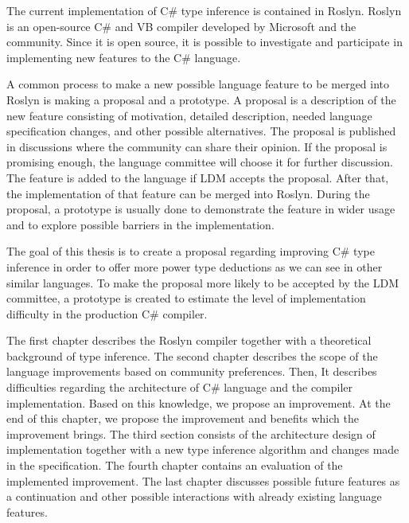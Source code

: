 The current implementation of C\# type inference is contained in Roslyn.
Roslyn is an open-source C\# and VB compiler developed by Microsoft and the community.
Since it is open source, it is possible to investigate and participate in implementing new features to the C\# language.

A common process to make a new possible language feature to be merged into Roslyn is making a proposal and a prototype.
A proposal is a description of the new feature consisting of motivation, detailed description, needed language specification changes, and other possible alternatives.
The proposal is published in discussions where the community can share their opinion.
If the proposal is promising enough, the language committee will choose it for further discussion.
The feature is added to the language if LDM accepts the proposal.
After that, the implementation of that feature can be merged into Roslyn.
During the proposal, a prototype is usually done to demonstrate the feature in wider usage and to explore possible barriers in the implementation.

The goal of this thesis is to create a proposal regarding improving C\# type inference in order to offer more power type deductions as we can see in other similar languages.
To make the proposal more likely to be accepted by the LDM committee, a prototype is created to estimate the level of implementation difficulty in the production C\# compiler.

The first chapter describes the Roslyn compiler together with a theoretical background of type inference.
The second chapter describes the scope of the language improvements based on community preferences.
Then, It describes difficulties regarding the architecture of C\# language and the compiler implementation.
Based on this knowledge, we propose an improvement.
At the end of this chapter, we propose the improvement and benefits which the improvement brings.
The third section consists of the architecture design of implementation together with a new type inference algorithm and changes made in the specification.
The fourth chapter contains an evaluation of the implemented improvement.
The last chapter discusses possible future features as a continuation and other possible interactions with already existing language features.